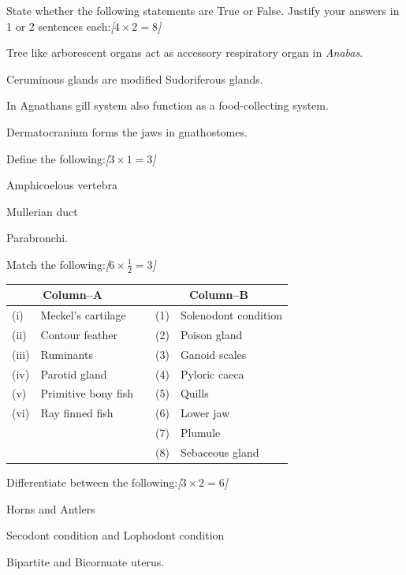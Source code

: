 \documentclass[11pt,a4paper]{article}
\newcommand{\pts}[1]{\hfill   \textit{[#1]}}
\begin{document}
\begin{parts}
  \item State whether the following statements are True or False. Justify your answers in 1 or 2 sentences each:\pts{$4  \times 2 = 8$}
  
\begin{parts}
    \item Tree like arborescent organs act as accessory respiratory organ in   \textit{Anabas}.
    \item Ceruminous glands are modified Sudoriferous glands.
    \item In Agnathans gill system also function as a food-collecting system.
    \item Dermatocranium forms the jaws in gnathostomes.
  \end{parts}

  \item Define the following:\pts{$3  \times 1 = 3$}
  
\begin{parts}
    \item Amphicoelous vertebra
    \item Mullerian duct
    \item Parabronchi.
  \end{parts}

  \item Match the following:\pts{$6  \times \frac{1}{2} = 3$}
  
\begin{center}
  
\begin{tabular}{llp{1.5cm}ll}
    \hline
    \multicolumn{2}{c}{   \textbf{Column--A}} & & \multicolumn{2}{c}{   \textbf{Column--B}} \\
    \hline
    (i) & Meckel's cartilage & & (1) & Solenodont condition \\
    (ii) & Contour feather & & (2) & Poison gland \\
    (iii) & Ruminants & & (3) & Ganoid scales \\
    (iv) & Parotid gland & & (4) & Pyloric caeca \\
    (v) & Primitive bony fish & & (5) & Quills \\
    (vi) & Ray finned fish & & (6) & Lower jaw \\
    & & & (7) & Plumule \\
    & & & (8) & Sebaceous gland \\
    \hline
  \end{tabular}
  \end{center}
  \medskip

  \item Differentiate between the following:\pts{$3  \times 2 = 6$}
  
\begin{parts}
    \item Horns and Antlers
    \item Secodont condition and Lophodont condition
    \item Bipartite and Bicornuate uterus.
  \end{parts}
\end{parts}
\end{document}
